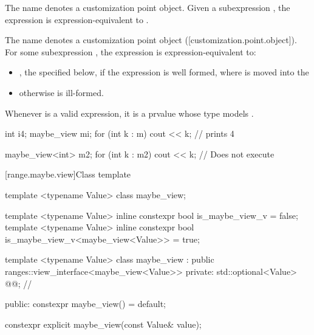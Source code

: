 \documentclass[a4paper,10pt,oneside,openany,final,article]{memoir}
\begin{document}
\begin{wording}
\pnum
{}%
The name  denotes a
customization point object.
Given a subexpression , the expression
 is expression-equivalent to
.

The name  denotes a customization point object ([customization.point.object]). For some subexpression , the expression  is expression-equivalent to:
\begin{itemize}
\item
  , the  specified below, if the expression is well formed, where  is moved into the 
\item
 otherwise  is ill-formed.
\end{itemize}


\begin{note}
  Whenever  is a valid expression, it is a prvalue whose type models .
\end{note}
\pnum

\begin{example}
  \begin{codeblock}
  int i{4};
  maybe_view m{i};
  for (int k : m) {
    cout << k;        // prints 4
  }

  maybe_view<int> m2{};
  for (int k : m2) {
    cout << k;        // Does not execute
  }
\end{codeblock}
\end{example}

[range.maybe.view]{Class template }

\begin{codeblock}

template <typename Value>
class maybe_view;

template <typename Value>
inline constexpr bool is_maybe_view_v = false;
template <typename Value>
inline constexpr bool is_maybe_view_v<maybe_view<Value>> = true;

template <typename Value>
class maybe_view : public ranges::view_interface<maybe_view<Value>> {
  private:
    std::optional}<Value> @@;             // \expos{}

  public:
    constexpr maybe_view() = default;

    constexpr explicit maybe_view(const Value& value);


\end{codeblock}
\end{wording}
\end{document}
